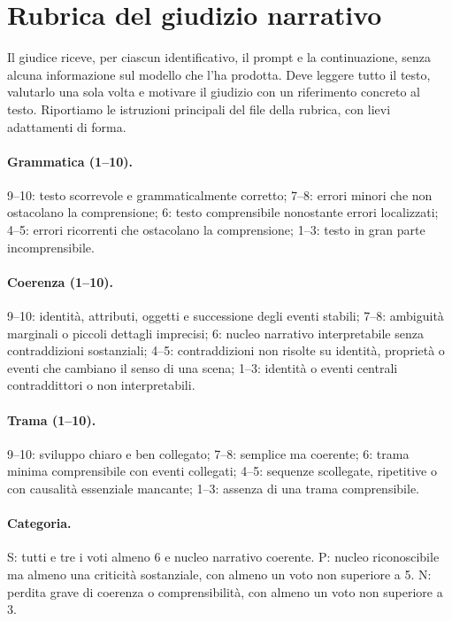 \section{Rubrica del giudizio narrativo}
\label{sec:appendice-rubrica}

Il giudice riceve, per ciascun identificativo, il prompt e la continuazione, senza alcuna informazione sul modello che l'ha prodotta. Deve leggere tutto il testo, valutarlo una sola volta e motivare il giudizio con un riferimento concreto al testo. Riportiamo le istruzioni principali del file della rubrica, con lievi adattamenti di forma.

\paragraph{Grammatica (1--10).} 9--10: testo scorrevole e grammaticalmente corretto; 7--8: errori minori che non ostacolano la comprensione; 6: testo comprensibile nonostante errori localizzati; 4--5: errori ricorrenti che ostacolano la comprensione; 1--3: testo in gran parte incomprensibile.

\paragraph{Coerenza (1--10).} 9--10: identità, attributi, oggetti e successione degli eventi stabili; 7--8: ambiguità marginali o piccoli dettagli imprecisi; 6: nucleo narrativo interpretabile senza contraddizioni sostanziali; 4--5: contraddizioni non risolte su identità, proprietà o eventi che cambiano il senso di una scena; 1--3: identità o eventi centrali contraddittori o non interpretabili.

\paragraph{Trama (1--10).} 9--10: sviluppo chiaro e ben collegato; 7--8: semplice ma coerente; 6: trama minima comprensibile con eventi collegati; 4--5: sequenze scollegate, ripetitive o con causalità essenziale mancante; 1--3: assenza di una trama comprensibile.

\paragraph{Categoria.} S: tutti e tre i voti almeno 6 e nucleo narrativo coerente. P: nucleo riconoscibile ma almeno una criticità sostanziale, con almeno un voto non superiore a 5. N: perdita grave di coerenza o comprensibilità, con almeno un voto non superiore a 3.

